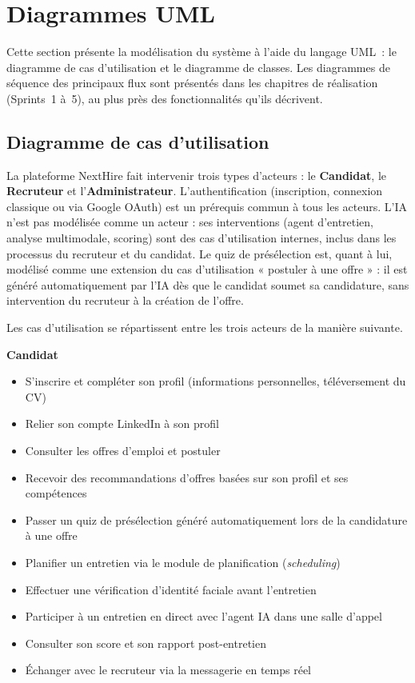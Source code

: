 \section{Diagrammes UML}

Cette section présente la modélisation du système à l'aide du langage UML~: le diagramme de cas d'utilisation et le diagramme de classes. Les diagrammes de séquence des principaux flux sont présentés dans les chapitres de réalisation (Sprints~1 à~5), au plus près des fonctionnalités qu'ils décrivent.

\subsection{Diagramme de cas d'utilisation}

La plateforme NextHire fait intervenir trois types d'acteurs : le \textbf{Candidat}, le \textbf{Recruteur} et l'\textbf{Administrateur}. L'authentification (inscription, connexion classique ou via Google OAuth) est un prérequis commun à tous les acteurs. L'IA n'est pas modélisée comme un acteur : ses interventions (agent d'entretien, analyse multimodale, scoring) sont des cas d'utilisation internes, inclus dans les processus du recruteur et du candidat. Le quiz de présélection est, quant à lui, modélisé comme une extension du cas d'utilisation « postuler à une offre » : il est généré automatiquement par l'IA dès que le candidat soumet sa candidature, sans intervention du recruteur à la création de l'offre.

Les cas d'utilisation se répartissent entre les trois acteurs de la manière suivante.

\noindent\textbf{Candidat}

\begin{itemize}
  \item S'inscrire et compléter son profil (informations personnelles, téléversement du CV)
  \item Relier son compte LinkedIn à son profil
  \item Consulter les offres d'emploi et postuler
  \item Recevoir des recommandations d'offres basées sur son profil et ses compétences
  \item Passer un quiz de présélection généré automatiquement lors de la candidature à une offre
  \item Planifier un entretien via le module de planification (\textit{scheduling})
  \item Effectuer une vérification d'identité faciale avant l'entretien
  \item Participer à un entretien en direct avec l'agent IA dans une salle d'appel
  \item Consulter son score et son rapport post-entretien
  \item Échanger avec le recruteur via la messagerie en temps réel
\end{itemize}

